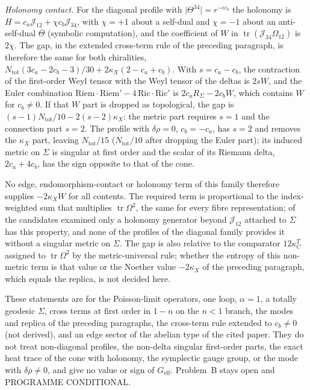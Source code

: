 \emph{Holonomy contact.} For the diagonal profile with \(\lvert\Theta^{34}\rvert=r^{-\epsilon c_b}\) the holonomy is \(H=c_a\mathcal J_{12}+\chi c_b\mathcal J_{34}\), with \(\chi=+1\) about a self-dual and \(\chi=-1\) about an anti-self-dual \(\bar\Theta\) (symbolic computation), and the coefficient of \(W\) in \(\operatorname{tr}(\mathcal J_{34}\Omega_{12})\) is \(2\chi\). The gap, in the extended cross-term rule of the preceding paragraph, is therefore the same for both chiralities, \(N_{\mathrm{tot}}(3c_a-2c_b-3)/30+2\kappa_X(2-c_a+c_b)\). With \(s=c_a-c_b\), the contraction of the first-order Weyl tensor with the Weyl tensor of the deltas is \(2sW\), and the Euler combination \(\mathrm{Riem}\cdot\mathrm{Riem}'-4\,\mathrm{Ric}\cdot\mathrm{Ric}'\) is \(2c_aR_\Sigma-2c_bW\), which contains \(W\) for \(c_b\neq0\). If that \(W\) part is dropped as topological, the gap is \((s-1)N_{\mathrm{tot}}/10-2(s-2)\kappa_X\): the metric part requires \(s=1\) and the connection part \(s=2\). The profile with \(\delta\rho=0\), \(c_b=-c_a\), has \(s=2\) and removes the \(\kappa_X\) part, leaving \(N_{\mathrm{tot}}/15\) (\(N_{\mathrm{tot}}/10\) after dropping the Euler part); its induced metric on \(\Sigma\) is singular at first order and the scalar of its Riemann delta, \(2c_a+4c_b\), has the sign opposite to that of the cone.

No edge, endomorphism-contact or holonomy term of this family therefore supplies \(-2\kappa_X W\) for all contents. The required term is proportional to the index-weighted sum that multiplies \(\operatorname{tr}\Omega^2\), the same for every fibre representation; of the candidates examined only a holonomy generator beyond \(\mathcal J_{12}\) attached to \(\Sigma\) has this property, and none of the profiles of the diagonal family provides it without a singular metric on \(\Sigma\). The gap is also relative to the comparator \(12\kappa_C^T\) assigned to \(\operatorname{tr}\Omega^2\) by the metric-universal rule; whether the entropy of this non-metric term is that value or the Noether value \(-2\kappa_X\) of the preceding paragraph, which equals the replica, is not decided here.

These statements are for the Poisson-limit operators, one loop, \(\alpha=1\), a totally geodesic \(\Sigma\), cross terms at first order in \(1-n\) on the \(n<1\) branch, the modes and replica of the preceding paragraphs, the cross-term rule extended to \(c_b\neq0\) (not derived), and an edge sector of the abelian type of the cited paper. They do not treat non-diagonal profiles, the non-delta singular first-order parts, the exact heat trace of the cone with holonomy, the symplectic gauge group, or the mode with \(\delta\rho\neq0\), and give no value or sign of \(G_{\mathrm{eff}}\). Problem~B stays open and PROGRAMME CONDITIONAL.

